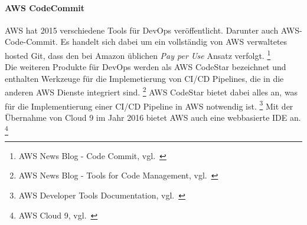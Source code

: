\paragraph{AWS CodeCommit}\label{collaboration_aws_code_commit}

AWS hat 2015 verschiedene Tools für DevOps veröffentlicht.
Darunter auch AWS-Code-Commit.
Es handelt sich dabei um ein vollständig von AWS verwaltetes hosted Git, dass den bei Amazon üblichen \textsl{Pay per Use} Ansatz verfolgt.
\footnote{AWS News Blog - Code Commit, vgl.~\cite{AWS_CODECOMMIT_ANOUNCEMENT}} \\

Die weiteren Produkte für DevOps werden als AWS CodeStar bezeichnet und enthalten Werkzeuge für die Implemetierung von CI/CD Pipelines, die in die anderen AWS Dienste integriert sind.
\footnote{AWS News Blog - Tools for Code Management, vgl.~\cite{AWS_CODESTAR_ANOUNCEMENT}}
AWS CodeStar bietet dabei alles an, was für die Implementierung einer CI/CD Pipeline in AWS notwendig ist. \footnote{AWS Developer Tools Documentation, vgl.~\cite{AWS_DEVELOPER_TOOLS}}
Mit der Übernahme von Cloud 9 im Jahr 2016 bietet AWS auch eine webbasierte IDE an. \footnote{AWS Cloud 9, vgl.~\cite{AWS_CLOUD9}}
